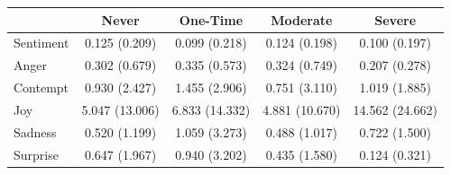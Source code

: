 \begin{tabular}{lcccc}
\toprule
 & Never & One-Time & Moderate & Severe \\
\midrule
Sentiment & 0.125 (0.209) & 0.099 (0.218) & 0.124 (0.198) & 0.100 (0.197) \\
Anger & 0.302 (0.679) & 0.335 (0.573) & 0.324 (0.749) & 0.207 (0.278) \\
Contempt & 0.930 (2.427) & 1.455 (2.906) & 0.751 (3.110) & 1.019 (1.885) \\
Joy & 5.047 (13.006) & 6.833 (14.332) & 4.881 (10.670) & 14.562 (24.662) \\
Sadness & 0.520 (1.199) & 1.059 (3.273) & 0.488 (1.017) & 0.722 (1.500) \\
Surprise & 0.647 (1.967) & 0.940 (3.202) & 0.435 (1.580) & 0.124 (0.321) \\
\bottomrule
\end{tabular}
